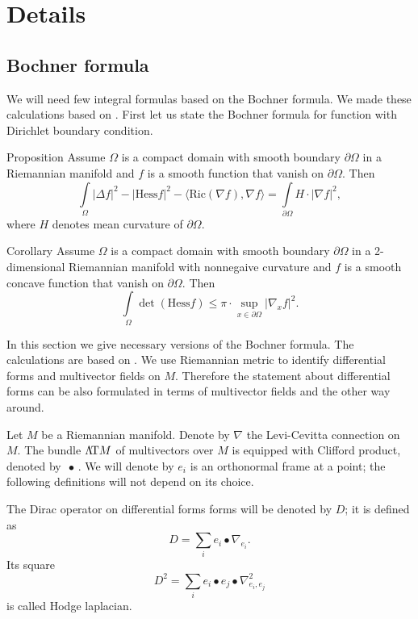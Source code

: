 \section{Details}

\subsection{Bochner formula}\label{sec:bochner}


We will need few integral formulas based on the Bochner formula.
We made these calculations based on \cite[Chapter II]{lawson-michelsohn}.
First let us state the Bochner formula for function with Dirichlet boundary condition.

\begin{thm}{Proposition}\label{prop:bochner-dirichle-old}
Assume $\Omega$ is a compact domain with smooth boundary $\partial \Omega$ in a Riemannian manifold
and $f$ is a smooth function that vanish on $\partial \Omega$.
Then
\[\int\limits_\Omega |\Delta f|^2
-|\mathrm{Hess}f|^2
-\langle\mathrm{Ric}(\nabla f),\nabla f\rangle
=\int\limits_{\partial\Omega}
H\cdot|\nabla f|^2,\]
where $H$ denotes mean curvature of $\partial \Omega$.
\end{thm}
 
\begin{thm}{Corollary}
Assume $\Omega$ is a compact domain with smooth boundary $\partial \Omega$ in a 2-dimensional Riemannian manifold with nonnegaive curvature
and $f$ is a smooth concave function that vanish on $\partial \Omega$.
Then
\[\int\limits_\Omega 
\det(\mathrm{Hess}f)
\le\pi\cdot\sup_{x\in\partial\Omega}|\nabla_x f|^2.\]

\end{thm}




In this section we give necessary versions of the Bochner formula.
The calculations are based on \cite[Chapter II]{lawson-michelsohn}.
We use Riemannian metric to identify differential forms and multivector fields on $M$.
Therefore the statement about differential forms can be also formulated in terms of multivector fields and the other way around.


Let $M$ be a Riemannian manifold.
Denote by $\nabla$ the Levi-Cevitta connection on $M$.
The bundle $\Lambda\!\mathrm{T} M$ of multivectors over $M$ is equipped with Clifford product, denoted by $\,\bullet \,$.
We will denote by $e_i$ is an orthonormal frame at a point; the following definitions will not depend on its choice.

The Dirac operator on differential forms forms will be denoted by $D$;
it is defined as
\[D=\sum_i e_i\bullet \nabla_{e_i}.\]
Its square 
\[D^2=\sum_i e_i\bullet e_j\bullet \nabla^2_{e_i,e_j}\]
is called Hodge laplacian.

